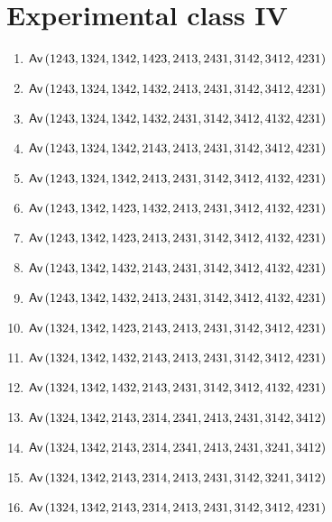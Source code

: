 \section{Experimental class IV}
\begin{enumerate}
\item $\textsf{Av}\left(1243,1324,1342,1423,2413,2431,3142,3412,4231\right)$
\item $\textsf{Av}\left(1243,1324,1342,1432,2413,2431,3142,3412,4231\right)$
\item $\textsf{Av}\left(1243,1324,1342,1432,2431,3142,3412,4132,4231\right)$
\item $\textsf{Av}\left(1243,1324,1342,2143,2413,2431,3142,3412,4231\right)$
\item $\textsf{Av}\left(1243,1324,1342,2413,2431,3142,3412,4132,4231\right)$
\item $\textsf{Av}\left(1243,1342,1423,1432,2413,2431,3412,4132,4231\right)$
\item $\textsf{Av}\left(1243,1342,1423,2413,2431,3142,3412,4132,4231\right)$
\item $\textsf{Av}\left(1243,1342,1432,2143,2431,3142,3412,4132,4231\right)$
\item $\textsf{Av}\left(1243,1342,1432,2413,2431,3142,3412,4132,4231\right)$
\item $\textsf{Av}\left(1324,1342,1423,2143,2413,2431,3142,3412,4231\right)$
\item $\textsf{Av}\left(1324,1342,1432,2143,2413,2431,3142,3412,4231\right)$
\item $\textsf{Av}\left(1324,1342,1432,2143,2431,3142,3412,4132,4231\right)$
\item $\textsf{Av}\left(1324,1342,2143,2314,2341,2413,2431,3142,3412\right)$
\item $\textsf{Av}\left(1324,1342,2143,2314,2341,2413,2431,3241,3412\right)$
\item $\textsf{Av}\left(1324,1342,2143,2314,2413,2431,3142,3241,3412\right)$
\item $\textsf{Av}\left(1324,1342,2143,2314,2413,2431,3142,3412,4231\right)$
\end{enumerate}

